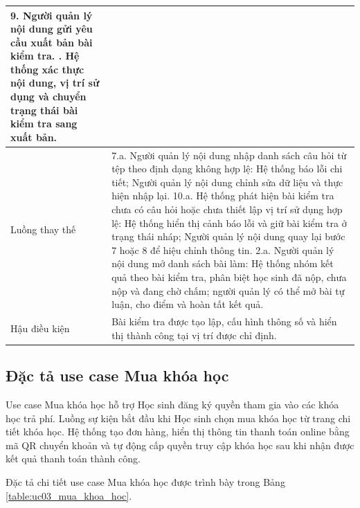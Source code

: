 ﻿\documentclass[../DoAn.tex]{subfiles}
\begin{document}
\begin{longtable}{|p{3.5cm}|p{10.5cm}|}
9. Người quản lý nội dung gửi yêu cầu xuất bản bài kiểm tra. \newline
10. Hệ thống xác thực nội dung, vị trí sử dụng và chuyển trạng thái bài kiểm tra sang xuất bản. \\ \hline
Luồng thay thế & 
7.a. Người quản lý nội dung nhập danh sách câu hỏi từ tệp theo định dạng không hợp lệ: Hệ thống báo lỗi chi tiết; Người quản lý nội dung chỉnh sửa dữ liệu và thực hiện nhập lại. \newline
10.a. Hệ thống phát hiện bài kiểm tra chưa có câu hỏi hoặc chưa thiết lập vị trí sử dụng hợp lệ: Hệ thống hiển thị cảnh báo lỗi và giữ bài kiểm tra ở trạng thái nháp; Người quản lý nội dung quay lại bước 7 hoặc 8 để hiệu chỉnh thông tin. \newline
2.a. Người quản lý nội dung mở danh sách bài làm: Hệ thống nhóm kết quả theo bài kiểm tra, phân biệt học sinh đã nộp, chưa nộp và đang chờ chấm; người quản lý có thể mở bài tự luận, cho điểm và hoàn tất kết quả. \\ \hline
Hậu điều kiện & Bài kiểm tra được tạo lập, cấu hình thông số và hiển thị thành công tại vị trí được chỉ định. \\ \hline
\end{longtable}
\endgroup

\subsection{Đặc tả use case Mua khóa học}
\label{subsection:2.3.3}

Use case Mua khóa học hỗ trợ Học sinh đăng ký quyền tham gia vào các khóa học trả phí. Luồng sự kiện bắt đầu khi Học sinh chọn mua khóa học từ trang chi tiết khóa học. Hệ thống tạo đơn hàng, hiển thị thông tin thanh toán online bằng mã QR chuyển khoản và tự động cấp quyền truy cập khóa học sau khi nhận được kết quả thanh toán thành công.

Đặc tả chi tiết use case Mua khóa học được trình bày trong Bảng \ref{table:uc03_mua_khoa_hoc}.
\end{document}
